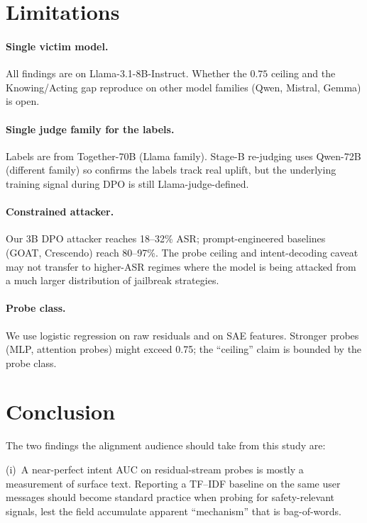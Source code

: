 \documentclass[11pt]{article}
\begin{document}
\section{Limitations}

\paragraph{Single victim model.}
All findings are on Llama-3.1-8B-Instruct. Whether the $0.75$ ceiling and the Knowing/Acting gap reproduce on other model families (Qwen, Mistral, Gemma) is open.

\paragraph{Single judge family for the labels.}
Labels are from Together-70B (Llama family). Stage-B re-judging uses Qwen-72B (different family) so confirms the labels track real uplift, but the underlying training signal during DPO is still Llama-judge-defined.

\paragraph{Constrained attacker.}
Our 3B DPO attacker reaches 18--32\% ASR; prompt-engineered baselines (GOAT, Crescendo) reach 80--97\%. The probe ceiling and intent-decoding caveat may not transfer to higher-ASR regimes where the model is being attacked from a much larger distribution of jailbreak strategies.

\paragraph{Probe class.}
We use logistic regression on raw residuals and on SAE features. Stronger probes (MLP, attention probes) might exceed 0.75; the ``ceiling'' claim is bounded by the probe class.


\section{Conclusion}

The two findings the alignment audience should take from this study are:

(i)~A near-perfect intent AUC on residual-stream probes is mostly a measurement of surface text. Reporting a TF--IDF baseline on the same user messages should become standard practice when probing for safety-relevant signals, lest the field accumulate apparent ``mechanism'' that is bag-of-words.
\end{document}
